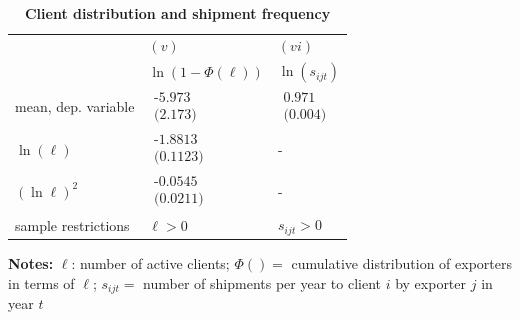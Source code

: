 \documentclass[12pt]{article}
\begin{document}
\begin{table}[tbp]
\caption{\textbf{Client distribution and shipment frequency}}
\label{tab:client_dist}\centering
{\small \ }
\par
{\small 
\begin{tabular}{lll}
\hline\hline
& $(v)$ & $(vi)$ \\ 
& $\ln (1-\Phi (\ell ))$ & $\ln (s_{ijt})$ \\ \hline
mean, dep. variable & $%
\begin{array}{c}
\text{-5.973} \\ 
\text{(2.173)}%
\end{array}%
$ & $%
\begin{array}{c}
\text{0.971 } \\ 
\text{(0.004)}%
\end{array}%
$ \\ 
$\ln (\ell )$ & $%
\begin{array}{c}
\text{-1.8813 } \\ 
\text{(0.1123)}%
\end{array}%
$ & - \\ 
$(\ln \ell )^{2}$ & $%
\begin{array}{c}
\text{-0.0545 } \\ 
\text{(0.0211)}%
\end{array}%
$ & - \\ \hline
sample restrictions & $\ell >0$ & $s_{ijt}>0$ \\ \hline
\end{tabular}
} \endcenter%
\begin{tablenotes}
\item \textbf{Notes:} $\ell$: number of active clients;  $\Phi ( ) = $ cumulative distribution of exporters in terms of  $\ell$;
$s_{ijt}=$ number of shipments per year to client $i$ by exporter $j$ in year $t$
\end{tablenotes}
\end{table}
\end{document}
